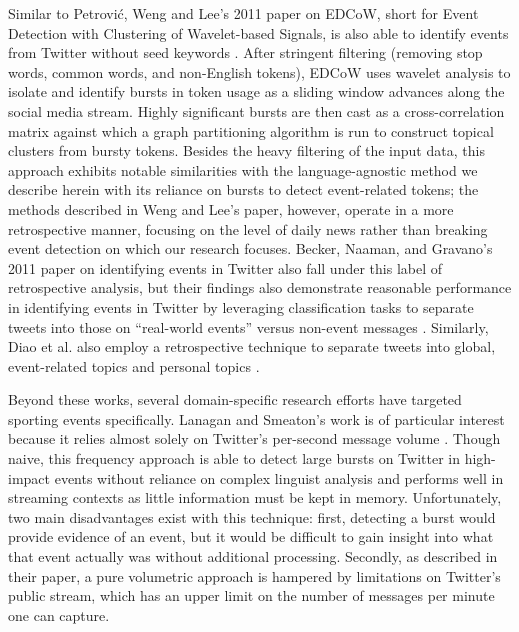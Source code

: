 \documentclass{sig-alternate}
\begin{document}
Similar to Petrovi\'{c}, Weng and Lee's 2011 paper on EDCoW, short for Event Detection with Clustering of Wavelet-based Signals, is also able to identify events from Twitter without seed keywords \cite{weng2011event}.
After stringent filtering (removing stop words, common words, and non-English tokens), EDCoW uses wavelet analysis to isolate and identify bursts in token usage as a sliding window advances along the social media stream.
Highly significant bursts are then cast as a cross-correlation matrix against which a graph partitioning algorithm is run to construct topical clusters from bursty tokens.
Besides the heavy filtering of the input data, this approach exhibits notable similarities with the language-agnostic method we describe herein with its reliance on bursts to detect event-related tokens; the methods described in Weng and Lee's paper, however, operate in a more retrospective manner, focusing on the level of daily news rather than breaking event detection on which our research focuses.
Becker, Naaman, and Gravano's 2011 paper on identifying events in Twitter also fall under this label of retrospective analysis, but their findings also demonstrate reasonable performance in identifying events in Twitter by leveraging classification tasks to separate tweets into those on ``real-world events'' versus non-event messages \cite{becker2011beyond-tr,becker2011beyond}.
Similarly, Diao et al. also employ a retrospective technique to separate tweets into global, event-related topics and personal topics \cite{diao2012finding}.

Beyond these works, several domain-specific research efforts have targeted sporting events specifically\cite{vasudevan2013twitter,Zhao2011,lanagan2011using}.
Lanagan and Smeaton's work is of particular interest because it relies almost solely on Twitter's per-second message volume \cite{lanagan2011using}.
Though naive, this frequency approach is able to detect large bursts on Twitter in high-impact events  without reliance on complex linguist analysis and performs well in streaming contexts as little information must be kept in memory.
Unfortunately, two main disadvantages exist with this technique: first, detecting a burst would provide evidence of an event, but it would be difficult to gain insight into what that event actually was without additional processing.
Secondly, as described in their paper, a pure volumetric approach is hampered by limitations on Twitter's public stream, which has an upper limit on the number of messages per minute one can capture.
\end{document}
